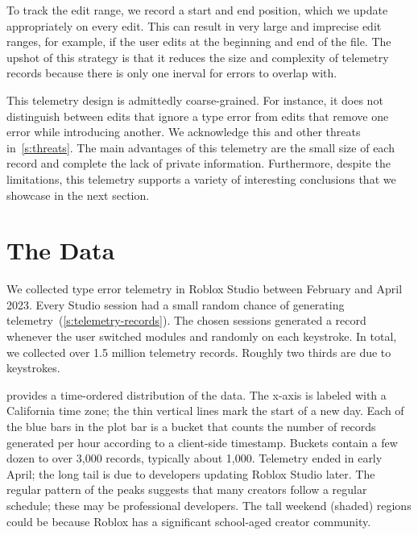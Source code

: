 \documentclass[english,submission,cleveref]{programming}
\begin{document}
To track the edit range, we record a start and end position, which we
update appropriately on every edit. This can result in very large and
imprecise edit ranges, for example, if the user edits at the beginning and end
of the file.
The upshot of this strategy is that it reduces the size and complexity of
telemetry records because there is only one inerval for errors to overlap with.

This telemetry design is admittedly coarse-grained.
For instance, it does not distinguish between edits that ignore a type
error from edits that remove one error while introducing another.
We acknowledge this and other threats in~\cref{s:threats}.
The main advantages of this telemetry are the small size of each record
and complete the lack of private information.
Furthermore, despite the limitations, this telemetry supports a variety of
interesting conclusions that we showcase in the next section.


\section{The Data}
\label{s:data}

We collected type error telemetry in Roblox Studio between February
and April 2023.
Every Studio session had a small random chance of generating
telemetry~(\cref{s:telemetry-records}).
The chosen sessions generated a record whenever the user switched modules and
randomly on each keystroke.
In total, we collected over 1.5 million telemetry records.
Roughly two thirds are due to keystrokes.

 provides a time-ordered distribution of the data.
The x-axis is labeled with a California time zone; the thin vertical lines
mark the start of a new day.
Each of the blue bars in the plot bar is a bucket that counts the number of
records generated per hour according to a client-side timestamp.
Buckets contain a few dozen to over 3,000 records, typically about 1,000.
Telemetry ended in early April; the long tail is due to developers
updating Roblox Studio later.
The regular pattern of the peaks suggests that many creators
follow a regular schedule; these may be
professional developers.
The tall weekend (shaded) regions could be because
Roblox has a significant school-aged creator community.
\end{document}
